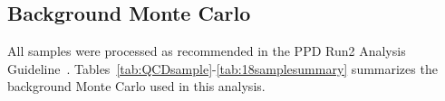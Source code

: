 %
%

\subsection{Background Monte Carlo}
All samples were processed as recommended in the PPD Run2 Analysis Guideline~\cite{pdmv}.
Tables~\ref{tab:QCDsample}-\ref{tab:18samplesummary} summarizes the background Monte Carlo used in this analysis.

